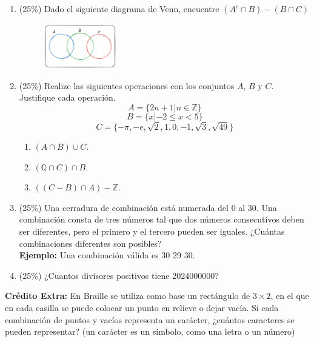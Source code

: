 \begin{enumerate}
    \item (25\%) Dado el siguiente diagrama de Venn, encuentre $(A^c\cap B)-(B\cap C)$
    \begin{figure}[h]
        \centering
        \includegraphics[width=0.3\textwidth]{../Imagenes/IMG1/venn.png}
        \caption{}
        \label{fig:enter-label}
    \end{figure}
    \item (25\%) Realize las siguientes operaciones con los conjuntos $A$, $B$ y $C$. Justifique cada operación.\[A=\{2n + 1 | n \in \mathbb{Z}\}\]\[B=\{x | -2 \leq x < 5\}\]\[C=\{-\pi, -e, \sqrt{2}, 1, 0, -1, \sqrt{3}, \sqrt{49}\}\]
    \begin{multicols}{2}
        \begin{enumerate}
        \item $(A\cap B)\cup C$.
        \item $(\mathbb{Q}\cap C)\cap B$.
        \item $((C-B)\cap A)-\mathbb{Z}$.
    \end{enumerate}
    \end{multicols}
    \item (25\%) Una cerradura de combinación está numerada del 0 al 30. Una combinación consta de tres números tal que dos números consecutivos deben ser diferentes, pero el primero y el tercero pueden ser iguales. ¿Cuántas combinaciones diferentes son posibles?\\
    \textbf{Ejemplo:} Una combinación válida es 30 29 30.
    \item (25\%) ¿Cuantos divisores positivos tiene 2024000000?
\end{enumerate}

\textbf{Crédito Extra:} En Braille se utiliza como base un rectángulo de $3\times2$, en el que en cada casilla se puede colocar un punto en relieve o dejar vacía. Si cada combinación de puntos y vacíos representa un carácter, ¿cuántos caracteres se pueden representar? (un carácter es un símbolo, como una letra o un número)


